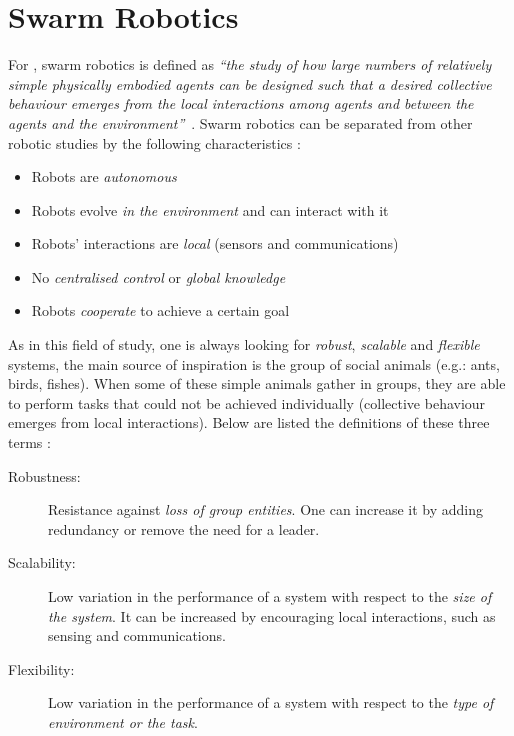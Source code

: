 \documentclass[oneside, a4paper, 12pt]{memoir}
\newcommand{\quot}[1]{\textit{\enquote{#1}}}
\begin{document}
	\section{Swarm Robotics}

	
			For \citet{csahin2005swarm}, swarm robotics is defined as \quot{the study of how large numbers of relatively simple physically embodied agents can be designed such that a desired collective behaviour emerges from the local interactions among agents and between the agents and the environment}~\citep{csahin2005swarm}. Swarm robotics can be separated from other robotic studies by the following characteristics \citep{brambilla2013swarm}:
		\begin{itemize}
			\item Robots are \emph{autonomous}
			\item Robots evolve \emph{in the environment} and can interact with it
			\item Robots' interactions are \emph{local} (sensors and communications)
			\item No \emph{centralised control} or \emph{global knowledge}
			\item Robots \emph{cooperate} to achieve a certain goal
			\end{itemize}
			As in this field of study, one is always looking for \emph{robust}, \emph{scalable} and \emph{flexible} systems, the main source of inspiration is the group of social animals (e.g.: ants, birds, fishes). When some of these simple animals gather in groups, they are able to perform tasks that could not be achieved individually (collective behaviour emerges from local interactions). Below are listed the definitions of these three terms \citep{brambilla2013swarm}:
			\label{def:robustness_scalability_flexibility}
			\begin{description}
			\item[Robustness:] Resistance against \emph{loss of group entities}. One can increase it by adding redundancy or remove the need for a leader.
			\item[Scalability:] Low variation in the performance of a system with respect to the \emph{size of the system}. It can be increased by encouraging local interactions, such as sensing and communications.
			\item[Flexibility:] Low variation in the performance of a system with respect to the \emph{type of environment or the task}.
		\end{description}
\end{document}
